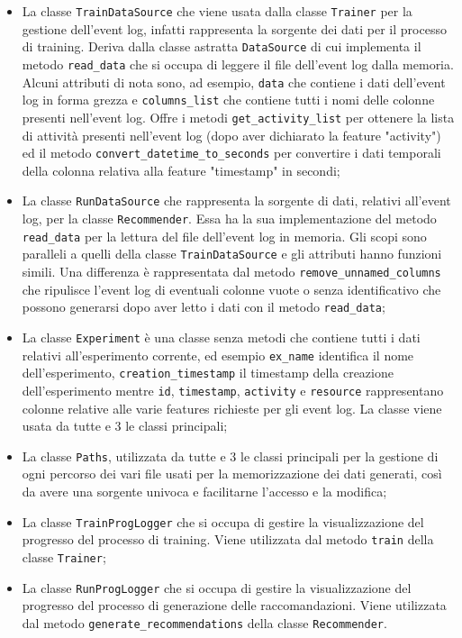 \begin{itemize}
\item La classe \texttt{TrainDataSource} che viene usata dalla classe \texttt{Trainer} per la gestione dell'event log, infatti rappresenta la sorgente dei dati per il processo di training. Deriva dalla classe astratta \texttt{DataSource} di cui implementa il metodo \texttt{read\_data} che si occupa di leggere il file dell'event log dalla memoria. Alcuni attributi di nota sono, ad esempio, \texttt{data} che contiene i dati dell'event log in forma grezza e \texttt{columns\_list} che contiene tutti i nomi delle colonne presenti nell'event log. Offre i metodi \texttt{get\_activity\_list} per ottenere la lista di attività presenti nell'event log (dopo aver dichiarato la feature "activity") ed il metodo \texttt{convert\_datetime\_to\_seconds} per convertire i dati temporali della colonna relativa alla feature "timestamp" in secondi;

\item La classe \texttt{RunDataSource} che rappresenta la sorgente di dati, relativi all'event log, per la classe \texttt{Recommender}. Essa ha la sua implementazione del metodo \texttt{read\_data} per la lettura del file dell'event log in memoria. Gli scopi sono paralleli a quelli della classe \texttt{TrainDataSource} e gli attributi hanno funzioni simili. Una differenza è rappresentata dal metodo \texttt{remove\_unnamed\_columns} che ripulisce l'event log di eventuali colonne vuote o senza identificativo che possono generarsi dopo aver letto i dati con il metodo \texttt{read\_data};

\item La classe \texttt{Experiment} è una classe senza metodi che contiene tutti i dati relativi all'esperimento corrente, ed esempio \texttt{ex\_name} identifica il nome dell'esperimento, \texttt{creation\_timestamp} il timestamp della creazione dell'esperimento mentre \texttt{id}, \texttt{timestamp}, \texttt{activity} e \texttt{resource} rappresentano colonne relative alle varie features richieste per gli event log. La classe viene usata da tutte e 3 le classi principali;

\item La classe \texttt{Paths}, utilizzata da tutte e 3 le classi principali per la gestione di ogni percorso dei vari file usati per la  memorizzazione dei dati generati, così da avere una sorgente univoca e facilitarne l'accesso e la modifica;

\item La classe \texttt{TrainProgLogger} che si occupa di gestire la visualizzazione del progresso del processo di training. Viene utilizzata dal metodo \texttt{train} della classe \texttt{Trainer};

\item La classe \texttt{RunProgLogger} che si occupa di gestire la visualizzazione del progresso del processo di generazione delle raccomandazioni. Viene utilizzata dal metodo \texttt{generate\_recommendations} della classe \texttt{Recommender}.

\end{itemize}


